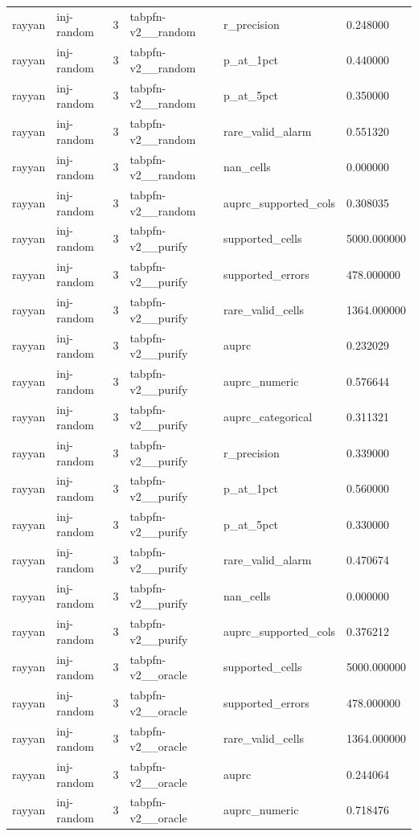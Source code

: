 \begin{tabular}{llllll}
rayyan & inj-random & 3 & tabpfn-v2\_\_random & r\_precision & 0.248000 \\
rayyan & inj-random & 3 & tabpfn-v2\_\_random & p\_at\_1pct & 0.440000 \\
rayyan & inj-random & 3 & tabpfn-v2\_\_random & p\_at\_5pct & 0.350000 \\
rayyan & inj-random & 3 & tabpfn-v2\_\_random & rare\_valid\_alarm & 0.551320 \\
rayyan & inj-random & 3 & tabpfn-v2\_\_random & nan\_cells & 0.000000 \\
rayyan & inj-random & 3 & tabpfn-v2\_\_random & auprc\_supported\_cols & 0.308035 \\
rayyan & inj-random & 3 & tabpfn-v2\_\_purify & supported\_cells & 5000.000000 \\
rayyan & inj-random & 3 & tabpfn-v2\_\_purify & supported\_errors & 478.000000 \\
rayyan & inj-random & 3 & tabpfn-v2\_\_purify & rare\_valid\_cells & 1364.000000 \\
rayyan & inj-random & 3 & tabpfn-v2\_\_purify & auprc & 0.232029 \\
rayyan & inj-random & 3 & tabpfn-v2\_\_purify & auprc\_numeric & 0.576644 \\
rayyan & inj-random & 3 & tabpfn-v2\_\_purify & auprc\_categorical & 0.311321 \\
rayyan & inj-random & 3 & tabpfn-v2\_\_purify & r\_precision & 0.339000 \\
rayyan & inj-random & 3 & tabpfn-v2\_\_purify & p\_at\_1pct & 0.560000 \\
rayyan & inj-random & 3 & tabpfn-v2\_\_purify & p\_at\_5pct & 0.330000 \\
rayyan & inj-random & 3 & tabpfn-v2\_\_purify & rare\_valid\_alarm & 0.470674 \\
rayyan & inj-random & 3 & tabpfn-v2\_\_purify & nan\_cells & 0.000000 \\
rayyan & inj-random & 3 & tabpfn-v2\_\_purify & auprc\_supported\_cols & 0.376212 \\
rayyan & inj-random & 3 & tabpfn-v2\_\_oracle & supported\_cells & 5000.000000 \\
rayyan & inj-random & 3 & tabpfn-v2\_\_oracle & supported\_errors & 478.000000 \\
rayyan & inj-random & 3 & tabpfn-v2\_\_oracle & rare\_valid\_cells & 1364.000000 \\
rayyan & inj-random & 3 & tabpfn-v2\_\_oracle & auprc & 0.244064 \\
rayyan & inj-random & 3 & tabpfn-v2\_\_oracle & auprc\_numeric & 0.718476 \\

\end{tabular}
